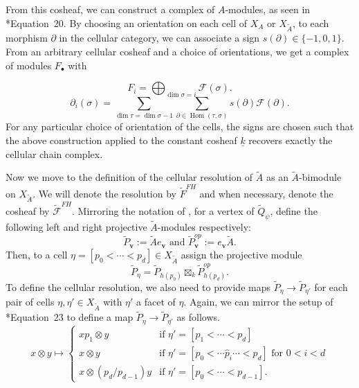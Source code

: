\documentclass{amsart}
\newcommand{\field}{k}
\DeclareMathOperator{\Hom}{Hom}
\theoremstyle{remark}
\begin{document}
From this cosheaf, we can construct a complex of $A$-modules, as seen in \cite{FH25}*{Equation~20}. By choosing an orientation on each cell of $X_A$ or $X_{\widetilde{A}}$, to each morphism $\partial$ in the cellular category, we can associate a sign $s(\partial)\in \{-1,0,1\}$. From an arbitrary cellular cosheaf and a choice of orientations, we get a complex of modules $F_\bullet$ with

\[F_i = \bigoplus_{\dim \sigma = i} \mathcal{F}(\sigma).\]
\[\partial_i(\sigma) = \sum_{\dim \tau = \dim \sigma - 1}\sum_{\partial \in \Hom(\tau,\sigma)} s(\partial) \mathcal{F}(\partial).\]
For any particular choice of orientation of the cells, the signs are chosen such that the above construction applied to the constant cosheaf $\underline{\field}$ recovers exactly the cellular chain complex.


Now we move to the definition of the cellular resolution of $\widetilde{A}$ as an $\widetilde{A}$-bimodule on $X_{\widetilde{A}}$. We will denote the resolution by $\widetilde{F}^{FH}$ and when necessary, denote the cosheaf by $\widetilde{\mathcal{F}}^{FH}$. Mirroring the notation of \cite{FH25}, for a vertex of $\widetilde{Q}_\psi$, define the following left and right projective $\widetilde{A}$-modules respectively:
\[\widetilde{P}_{\bm{v}} := \widetilde{A}e_{\bm{v}}\text{ and } \widetilde{P}_{\bm{v}}^{op} := e_{\bm{v}} \widetilde{A}.\]
Then, to a cell $\eta = [p_0<\cdots < p_d]\in X_{\widetilde{A}}$ assign the projective module
\[\widetilde{P}_{\eta} = \widetilde{P}_{h(p_0)}\boxtimes_{\field} \widetilde{P}^{op}_{h(p_d)}.\]
To define the cellular resolution, we also need to provide maps $\widetilde{P}_{\eta}\rightarrow \widetilde{P}_{\eta'}$ for each pair of cells $\eta,\eta'\in X_{\widetilde{A}}$ with $\eta'$ a facet of $\eta$. Again, we can mirror the setup of \cite{FH25}*{Equation~23} to define a map $\widetilde{P}_{\eta}\rightarrow \widetilde{P}_{\eta'}$ as follows.
\begin{equation}
  \label{eq:hpa-boundary}
x\otimes y\mapsto
\begin{cases}
  xp_1\otimes y & \text{if }\eta'=[p_1<\cdots<p_d]\\ %
  x\otimes y & \text{if }\eta'=[p_0<\cdots \widehat{p}_i \cdots < p_d] \text{ for } 0<i<d\\
  x\otimes (p_{d}/p_{d-1})y & \text{if }\eta'=[p_0<\cdots<p_{d-1}].
\end{cases}
\end{equation}
\end{document}
